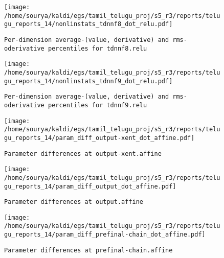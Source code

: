 \documentclass[prl,10pt,twocolumn]{revtex4}
\begin{document}
\newpage
\begin{figure}[h]
  \begin{center}
    \caption{\texttt{Per-dimension average-(value, derivative) and rms-oderivative percentiles for tdnnf8.relu}}
    \texttt{[image: /home/sourya/kaldi/egs/tamil\_telugu\_proj/s5\_r3/reports/telugu\_reports\_14/nonlinstats\_tdnnf8\_dot\_relu.pdf]}
  \end{center}
\end{figure}
\clearpage


\newpage
\begin{figure}[h]
  \begin{center}
    \caption{\texttt{Per-dimension average-(value, derivative) and rms-oderivative percentiles for tdnnf9.relu}}
    \texttt{[image: /home/sourya/kaldi/egs/tamil\_telugu\_proj/s5\_r3/reports/telugu\_reports\_14/nonlinstats\_tdnnf9\_dot\_relu.pdf]}
  \end{center}
\end{figure}
\clearpage


\newpage
\begin{figure}[h]
  \begin{center}
    \caption{\texttt{Parameter differences at output-xent.affine}}
    \texttt{[image: /home/sourya/kaldi/egs/tamil\_telugu\_proj/s5\_r3/reports/telugu\_reports\_14/param\_diff\_output-xent\_dot\_affine.pdf]}
  \end{center}
\end{figure}
\clearpage


\newpage
\begin{figure}[h]
  \begin{center}
    \caption{\texttt{Parameter differences at output.affine}}
    \texttt{[image: /home/sourya/kaldi/egs/tamil\_telugu\_proj/s5\_r3/reports/telugu\_reports\_14/param\_diff\_output\_dot\_affine.pdf]}
  \end{center}
\end{figure}
\clearpage


\newpage
\begin{figure}[h]
  \begin{center}
    \caption{\texttt{Parameter differences at prefinal-chain.affine}}
    \texttt{[image: /home/sourya/kaldi/egs/tamil\_telugu\_proj/s5\_r3/reports/telugu\_reports\_14/param\_diff\_prefinal-chain\_dot\_affine.pdf]}
  \end{center}
\end{figure}
\clearpage
\end{document}
